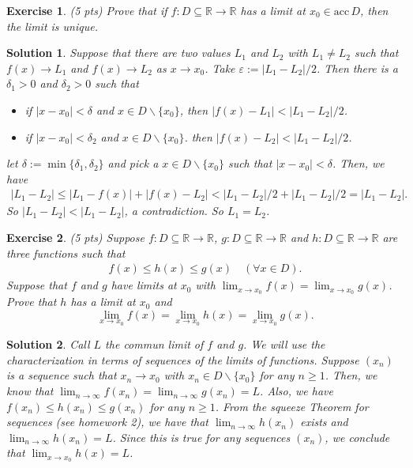 \documentclass[12pt]{article}
\newcommand{\bR}{\mathbb{R}}
\newcommand{\ra}{\rightarrow}
\theoremstyle{plain}
\newtheorem{exer}{\textbf{Exercise}}}
\theoremstyle{plain}
\newtheorem*{sol}{\textbf{Solution}}}
\begin{document}
\begin{exer}
(5 pts)
Prove that if $f : D \subseteq \bR \ra \bR$ has a limit at $x_0 \in \mathrm{acc}\, D$, then the limit is unique.
\end{exer}
\begin{sol}
Suppose that there are two values $L_1$ and $L_2$ with $L_1 \neq L_2$ such that $f(x) \ra L_1$ and $f(x) \ra L_2$ as $x \ra x_0$. Take $\varepsilon := |L_1 - L_2|/2$. Then there is a $\delta_1 > 0$ and $\delta_2 > 0$ such that 
	\begin{itemize}
	\item if $|x - x_0| < \delta$ and $x \in D \backslash \{ x_0 \}$, then $|f(x) - L_1| < |L_1 - L_2|/2$.
	\item if $|x - x_0| < \delta_2$ and $x \in D \backslash \{ x_0 \}$. then $|f(x) - L_2| < |L_1 - L_2|/2$.
	\end{itemize}
let $\delta := \min \{ \delta_1 , \delta_2 \}$ and pick a $x \in D\backslash \{ x_0 \}$ such that $|x - x_0| < \delta$. Then, we have
	\begin{align*}
	|L_1 - L_2| \leq |L_1 - f(x)| + |f(x) - L_2| < |L_1 - L_2|/2 + |L_1 - L_2|/2 = |L_1 - L_2| .
	\end{align*}
So $|L_1 - L_2| < |L_1 - L_2|$, a contradiction. So $L_1 = L_2$.
\end{sol}

\begin{exer}
(5 pts)
Suppose $f: D \subseteq \bR \ra \bR$, $g: D \subseteq \bR \ra \bR$ and $h : D \subseteq \bR \ra \bR$ are three functions such that
	\begin{align*}
	f(x) \leq h(x) \leq g(x) \quad (\forall x \in D ) .
	\end{align*}
Suppose that $f$ and $g$ have limits at $x_0$ with $\lim_{x \ra x_0} f(x) = \lim_{x \ra x_0} g(x)$. Prove that $h$ has a limit at $x_0$ and
	$$
	\lim_{x \ra x_0} f(x) = \lim_{x \ra x_0} h(x) = \lim_{x \ra x_0} g(x) .
	$$
\end{exer}
\begin{sol}
Call $L$ the commun limit of $f$ and $g$. We will use the characterization in terms of sequences of the limits of functions. Suppose $(x_n)$ is a sequence such that $x_n \ra x_0$ with $x_n \in D \backslash \{ x_0 \}$ for any $n \geq 1$. Then, we know that $\lim_{n\ra \infty} f(x_n) = \lim_{n \ra \infty} g(x_n) = L$. Also, we have $f(x_n) \leq h(x_n) \leq g(x_n)$ for any $n \geq 1$. From the squeeze Theorem for sequences (see homework 2), we have that $\lim_{n \ra \infty} h(x_n)$ exists and $\lim_{n \ra \infty} h(x_n) = L$. Since this is true for any sequences $(x_n)$, we conclude that $\lim_{x \ra x_0} h(x) = L$.
\end{sol}
\end{document}
